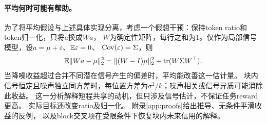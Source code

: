 \paragraph{平均何时可能有帮助。}
为了将平均假设与上述具体实现分离，考虑一个假想干预：保持token ratio和token归一化，只将$a$换成$Wa$，
$W$为确定性矩阵，每行之和为1。仅作为局部信号模型，设$a=\mu+\varepsilon$、$\mathbb{E}\varepsilon=0$、
$\operatorname{Cov}(\varepsilon)=\Sigma$，则
\begin{equation}
 \mathbb{E}\|Wa-\mu\|_2^2=\|(W-I)\mu\|_2^2+\operatorname{tr}(W\Sigma W^\top).
 \label{eq:mse}
\end{equation}
当降噪收益超过合并不同潜在信号产生的偏差时，平均能改善这一估计量。
块内信号恒定且噪声独立同方差时，每位置方差为$\sigma^2/k$；噪声相关或信号异质可能消除此收益。
这一分析解释短程共享的动机，但只涉及信号估计，不保证任务reward更高。
实际目标还改变ratio及归一化。
附录\ref{app:proofs}给出推导、无条件平滑收益的反例，
以及block交叉项在受限条件下恢复块内未来信用的解释。
